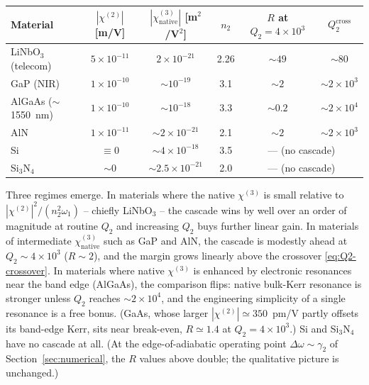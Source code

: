\documentclass[11pt,a4paper]{article}
\newcommand{\chitwo}{\chi^{(2)}}
\newcommand{\chithree}{\chi^{(3)}}
\newcommand{\Dom}{\Delta\omega}
\begin{document}
\begin{center}
\begin{tabular}{lccccc}
\toprule
Material & $|\chitwo|$ [m/V] & $|\chithree_\text{native}|$ [m$^{2}$/V$^{2}$]
         & $n_2$ & $R$ at $Q_2{=}4{\times}10^{3}$ & $Q_2^\text{cross}$ \\
\midrule
LiNbO$_3$ (telecom)     & $5\!\times\!10^{-11}$   & $2\!\times\!10^{-21}$ & 2.26 & $\sim\!49$ & $\sim 80$ \\
GaP (NIR)               & $1\!\times\!10^{-10}$   & $\sim\!10^{-19}$      & 3.1  & $\sim\!2$ & $\sim 2\!\times\!10^{3}$ \\
AlGaAs ($\sim$\,1550~nm)& $1\!\times\!10^{-10}$   & $\sim\!10^{-18}$      & 3.3  & $\sim\!0.2$ & $\sim 2\!\times\!10^{4}$ \\
AlN                     & $1\!\times\!10^{-11}$   & $\sim\!2\!\times\!10^{-21}$ & 2.1 & $\sim\!2$ & $\sim 2\!\times\!10^{3}$ \\
Si                      & $\equiv 0$              & $\sim\!4\!\times\!10^{-18}$ & 3.5  & \multicolumn{2}{c}{--- (no cascade)} \\
Si$_3$N$_4$             & $\sim 0$                & $\sim\!2.5\!\times\!10^{-21}$ & 2.0  & \multicolumn{2}{c}{--- (no cascade)} \\
\bottomrule
\end{tabular}
\end{center}

\noindent
Three regimes emerge.  In materials where the native $\chithree$ is
small relative to $|\chitwo|^{2}/(n_2^{2}\omega_1)$ -- chiefly
LiNbO$_3$ -- the cascade wins by well over an order of magnitude at
routine $Q_2$ and increasing $Q_2$ buys further linear gain.  In
materials of intermediate $\chithree_\text{native}$ such as GaP and AlN,
the cascade is modestly ahead at $Q_2\sim 4\!\times\!10^{3}$ ($R\sim2$),
and the margin grows linearly above the crossover
\eqref{eq:Q2-crossover}.  In materials where native $\chithree$ is
enhanced by electronic resonances near the band edge (AlGaAs), the
comparison flips: native bulk-Kerr resonance is stronger unless $Q_2$
reaches $\sim\!2\times10^{4}$, and the engineering simplicity of a single
resonance is a free bonus.  (GaAs, whose larger
$|\chitwo|\simeq350$~pm/V partly offsets its band-edge Kerr, sits near
break-even, $R\simeq1.4$ at $Q_2=4\times10^3$.)
Si and Si$_3$N$_4$ have no cascade at all.  (At the
edge-of-adiabatic operating point $\Dom\!\sim\!\gamma_2$ of
Section~\ref{sec:numerical}, the $R$ values above double; the
qualitative picture is unchanged.)
\end{document}

